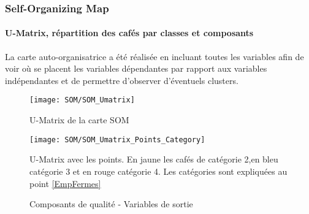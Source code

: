 \newpage
\subsubsection{Self-Organizing Map}\label{SOM}

\paragraph{U-Matrix, répartition des cafés par classes et composants} 
La carte auto-organisatrice a été réalisée en incluant toutes les variables afin de voir où se placent les variables dépendantes par rapport aux variables indépendantes et de permettre d'observer d'éventuels clusters. 


\begin{figure}[H]
	\centering
	\texttt{[image: SOM/SOM\_Umatrix]}
	\caption{U-Matrix de la carte SOM}
	\label{}
\end{figure}

\begin{figure}[H]
	\centering
	\texttt{[image: SOM/SOM\_Umatrix\_Points\_Category]}
	\caption{\label{umatrix_cat}U-Matrix avec les points. En jaune les cafés de catégorie 2,en bleu catégorie 3 et en rouge catégorie 4. Les catégories sont expliquées au point \ref{EmpFermes}}
	\label{}
\end{figure}


\begin{figure}[H]
	\caption{Composants de qualité - Variables de sortie}
	\centering
		\hfill
		\hfill
		\newline
		\hfill
		\hfill
		\newline
		\hfill
		\hfill
		\newline
		\centering
		\hfill
\end{figure}




